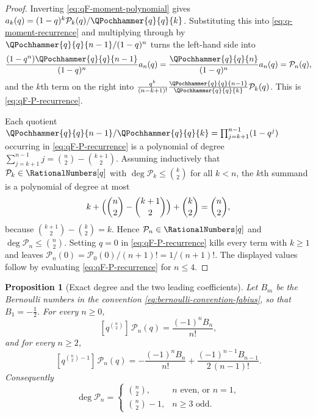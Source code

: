 \documentclass[11pt,a4paper,oneside,openany]{book}
\newtheorem{proposition}[proposition]{Proposition}
\theoremstyle{definition}
\theoremstyle{remark}
\begin{document}
\begin{proof}
Inverting \eqref{eq:qF-moment-polynomial} gives
$a_k(q)=(1-q)^k\mathcal P_k(q)/\QPochhammer{q}{q}{k}$.  Substituting this into
\eqref{eq:q-moment-recurrence} and multiplying through by
$\QPochhammer{q}{q}{n-1}/(1-q)^n$ turns the left-hand side into
\[
 \frac{(1-q^n)\QPochhammer{q}{q}{n-1}}{(1-q)^n}a_n(q)
 =\frac{\QPochhammer{q}{q}{n}}{(1-q)^n}a_n(q)
 =\mathcal P_n(q),
\]
and the $k$th term on the right into
$\frac{q^k}{(n-k+1)!}\frac{\QPochhammer{q}{q}{n-1}}{\QPochhammer{q}{q}{k}}\mathcal P_k(q)$.  This is
\eqref{eq:qF-P-recurrence}.

Each quotient $\QPochhammer{q}{q}{n-1}/\QPochhammer{q}{q}{k}=\prod_{j=k+1}^{n-1}(1-q^j)$ occurring in
\eqref{eq:qF-P-recurrence} is a polynomial of degree
$\sum_{j=k+1}^{n-1}j=\binom n2-\binom{k+1}2$.  Assuming inductively that
$\mathcal P_k\in\RationalNumbers[q]$ with $\deg\mathcal P_k\le\binom k2$ for all $k<n$, the
$k$th summand is a polynomial of degree at most
\[
 k+\Bigl(\binom n2-\binom{k+1}2\Bigr)+\binom k2
 =\binom n2,
\]
because $\binom{k+1}2-\binom k2=k$.  Hence $\mathcal P_n\in\RationalNumbers[q]$ and
$\deg\mathcal P_n\le\binom n2$.  Setting $q=0$ in \eqref{eq:qF-P-recurrence}
kills every term with $k\ge1$ and leaves
$\mathcal P_n(0)=\mathcal P_0(0)/(n+1)!=1/(n+1)!$.  The displayed values follow
by evaluating \eqref{eq:qF-P-recurrence} for $n\le4$.
\end{proof}

\begin{proposition}[Exact degree and the two leading coefficients]\label{prop:qF-P-degree-sharp}
Let $B_m$ be the Bernoulli numbers in the convention
\eqref{eq:bernoulli-convention-fabius}, so that $B_1=-\tfrac12$.  For every
$n\ge0$,
\begin{equation}\label{eq:qF-P-leading}
 [q^{\binom n2}]\,\mathcal P_n(q)=\frac{(-1)^nB_n}{n!},
\end{equation}
and for every $n\ge2$,
\begin{equation}\label{eq:qF-P-subleading}
 [q^{\binom n2-1}]\,\mathcal P_n(q)
 =-\frac{(-1)^nB_n}{n!}+\frac{(-1)^{n-1}B_{n-1}}{2\,(n-1)!}.
\end{equation}
Consequently
\begin{equation}\label{eq:qF-P-exact-degree}
 \deg\mathcal P_n=
 \begin{cases}
  \binom n2, & n\text{ even, or }n=1,\\[2pt]
  \binom n2-1, & n\ge3\text{ odd.}
 \end{cases}
\end{equation}
\end{proposition}
\end{document}
